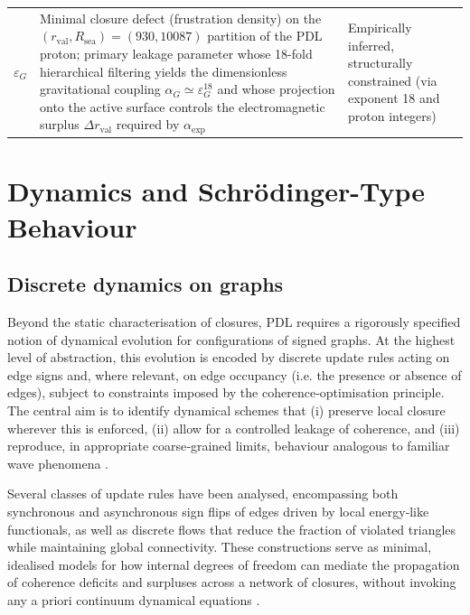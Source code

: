 \documentclass[11pt,a4paper]{article}
\begin{document}
\begin{longtable}{@{}L{1.5cm}L{7.3cm}L{4.2cm}p{1.8cm}@{}}
  $\varepsilon_G$ & 
  Minimal closure defect (frustration density) on the $(r_{\text{val}},R_{\text{sea}})=(930,10087)$ partition of the PDL proton; primary leakage parameter whose 18-fold hierarchical filtering yields the dimensionless gravitational coupling $\alpha_G \simeq \varepsilon_G^{18}$ and whose projection onto the active surface controls the electromagnetic surplus $\Delta r_{\text{val}}$ required by $\alpha_{\text{exp}}$ & Empirically inferred, structurally constrained (via exponent 18 and proton integers) & 
  \cite{Exponent_18_PDL_2026,Topological_Reformulation_PDL_2026,Universal_Coherence_Leakage_V3_2026} \\[0.4em]

\end{longtable}

\section{Dynamics and Schr\"odinger-Type Behaviour}
\label{sec:dynamics}

\subsection{Discrete dynamics on graphs}
\label{subsec:discrete_dynamics}

Beyond the static characterisation of closures, PDL requires a rigorously specified notion of dynamical evolution for configurations of signed graphs. At the highest level of abstraction, this evolution is encoded by discrete update rules acting on edge signs and, where relevant, on edge occupancy (i.e. the presence or absence of edges), subject to constraints imposed by the coherence‑optimisation principle. The central aim is to identify dynamical schemes that (i) preserve local closure wherever this is enforced, (ii) allow for a controlled leakage of coherence, and (iii) reproduce, in appropriate coarse‑grained limits, behaviour analogous to familiar wave phenomena \citep{PDL_Main_2026,PDL_position}.

Several classes of update rules have been analysed, encompassing both synchronous and asynchronous sign flips of edges driven by local energy‑like functionals, as well as discrete flows that reduce the fraction of violated triangles while maintaining global connectivity. These constructions serve as minimal, idealised models for how internal degrees of freedom can mediate the propagation of coherence deficits and surpluses across a network of closures, without invoking any a priori continuum dynamical equations \citep{Coherence_Leakage_18_2026}.
\end{document}
